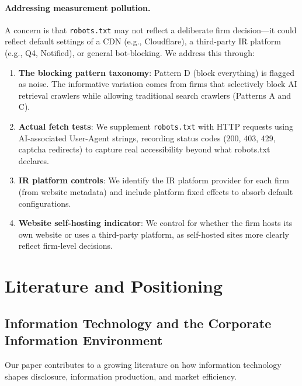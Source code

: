 \documentclass[12pt,a4paper]{article}
\begin{document}
\paragraph{Addressing measurement pollution.} A concern is that \texttt{robots.txt} may not reflect a deliberate firm decision---it could reflect default settings of a CDN (e.g., Cloudflare), a third-party IR platform (e.g., Q4, Notified), or general bot-blocking. We address this through:
\begin{enumerate}
    \item \textbf{The blocking pattern taxonomy}: Pattern D (block everything) is flagged as noise. The informative variation comes from firms that selectively block AI retrieval crawlers while allowing traditional search crawlers (Patterns A and C).
    \item \textbf{Actual fetch tests}: We supplement \texttt{robots.txt} with HTTP requests using AI-associated User-Agent strings, recording status codes (200, 403, 429, captcha redirects) to capture real accessibility beyond what robots.txt declares.
    \item \textbf{IR platform controls}: We identify the IR platform provider for each firm (from website metadata) and include platform fixed effects to absorb default configurations.
    \item \textbf{Website self-hosting indicator}: We control for whether the firm hosts its own website or uses a third-party platform, as self-hosted sites more clearly reflect firm-level decisions.
\end{enumerate}

\section{Literature and Positioning}

\subsection{Information Technology and the Corporate Information Environment}

Our paper contributes to a growing literature on how information technology shapes disclosure, information production, and market efficiency.
\end{document}

